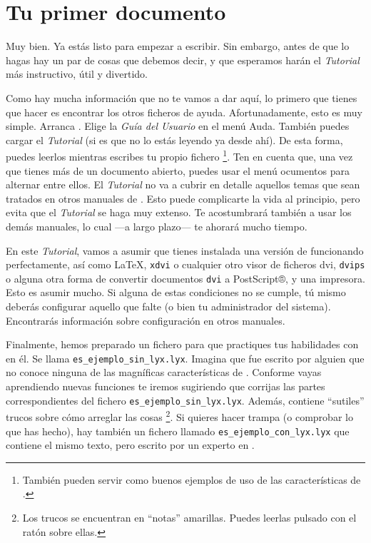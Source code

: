 

\section{Tu primer documento \LyX{}}

\label{sec:first-doc-ex} Muy bien\@. Ya estás listo para empezar
a escribir. Sin embargo, antes de que lo hagas hay un par de cosas
que debemos decir, y que esperamos harán el \emph{Tutorial} más instructivo,
útil y divertido.

Como hay mucha información que no te vamos a dar aquí, lo primero
que tienes que hacer es encontrar los otros ficheros de ayuda. Afortunadamente,
esto es muy simple. Arranca \LyX{}. Elige la \emph{Guía del Usuario}
en el menú \textsf{A}\textsf{}\textsf{uda}. También puedes
cargar el \emph{Tutorial} (si es que no lo estás leyendo ya desde
ahí). De esta forma, puedes leerlos mientras escribes tu propio fichero%
\footnote{También pueden servir como buenos ejemplos de uso de las características
de \LyX{}.%
}. Ten en cuenta que, una vez que tienes más de un documento abierto,
puedes usar el menú \textsf{}\textsf{ocumentos} para alternar
entre ellos. El \emph{Tutorial} no va a cubrir en detalle aquellos
temas que sean tratados en otros manuales de \LyX{}. Esto puede complicarte
la vida al principio, pero evita que el \emph{Tutorial} se haga muy
extenso. Te acostumbrará también a usar los demás manuales, lo cual
---a largo plazo--- te ahorará mucho tiempo.

En este \emph{Tutorial}, vamos a asumir que tienes instalada una versión
de \LyX{} funcionando perfectamente, así como \LaTeX{}, \texttt{xdvi}
o cualquier otro visor de ficheros dvi, \texttt{dvips} o alguna otra
forma de convertir documentos \texttt{dvi} a PostScript®, y una impresora.
Esto es asumir mucho. Si alguna de estas condiciones no se cumple,
tú mismo deberás configurar aquello que falte (o bien tu administrador
del sistema). Encontrarás información sobre configuración en otros
manuales.

Finalmente, hemos preparado un fichero para que practiques tus habilidades
con \LyX{} en él. Se llama \texttt{es\_ejemplo\_sin\_lyx.lyx}. Imagina
que fue escrito por alguien que no conoce ninguna de las magníficas
características de \LyX{}. Conforme vayas aprendiendo nuevas funciones
te iremos sugiriendo que corrijas las partes correspondientes del
fichero \texttt{es\_ejemplo\_sin\_lyx.lyx}. Además, contiene {}``sutiles''
trucos sobre cómo arreglar las cosas%
\footnote{Los trucos se encuentran en {}``notas'' amarillas. Puedes leerlas
pulsado con el ratón sobre ellas.%
}. Si quieres hacer trampa (o comprobar lo que has hecho), hay también
un fichero llamado \texttt{es\_ejemplo\_con\_lyx.lyx} que contiene
el mismo texto, pero escrito por un experto en \LyX{}.

